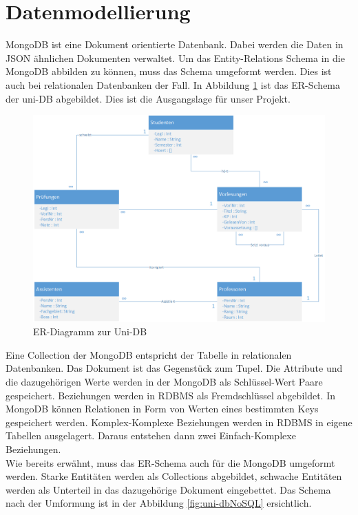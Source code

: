 \section{Datenmodellierung}
\label{kap:ERDiagramm}
MongoDB ist eine Dokument orientierte Datenbank. Dabei werden die Daten in JSON
ähnlichen Dokumenten verwaltet. Um das Entity-Relations Schema in die MongoDB
abbilden zu können, muss das Schema umgeformt werden. Dies ist auch bei
relationalen Datenbanken der Fall. In Abbildung \ref{fig:uni-db} ist das
ER-Schema der uni-DB abgebildet. Dies ist die Ausgangslage für unser Projekt.
\begin{figure}[h] 
	\centering
		\includegraphics[width=1\textwidth]{./pictures/NoSQL-DB_ER_Diagramm_UNI-DB.png}
	\caption{ER-Diagramm zur Uni-DB}
	\label{fig:uni-db}
\end{figure}
Eine Collection der MongoDB entspricht der Tabelle in relationalen Datenbanken.
Das Dokument ist das Gegenstück zum Tupel. Die Attribute und die dazugehörigen
Werte werden in der MongoDB als Schlüssel-Wert Paare gespeichert.
Beziehungen werden in RDBMS als Fremdschlüssel abgebildet. In MongoDB 
können Relationen in Form von Werten eines bestimmten Keys gespeichert werden.
Komplex-Komplexe Beziehungen werden in RDBMS in eigene
Tabellen ausgelagert. Daraus entstehen dann zwei Einfach-Komplexe
Beziehungen. \\
Wie bereits erwähnt, muss das ER-Schema auch für die MongoDB umgeformt werden.
Starke Entitäten werden als Collections abgebildet, schwache Entitäten werden 
als Unterteil in das dazugehörige Dokument eingebettet.
Das Schema nach der Umformung ist in der Abbildung \ref{fig:uni-dbNoSQL}
ersichtlich.
